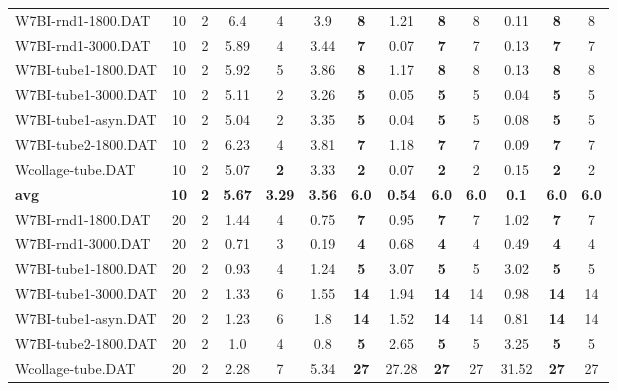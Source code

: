 \begin{table}[h]
{\begin{tabular}{lcccccccccccc}
W7BI-rnd1-1800.DAT & 10 & 2 & 6.4 & 4 & 3.9 &  \textbf{8} & 1.21 &  \textbf{8} & 8 &  \textcolor{blue2}{0.11} &  \textbf{8} & 8 \\
W7BI-rnd1-3000.DAT & 10 & 2 & 5.89 & 4 & 3.44 &  \textbf{7} &  \textcolor{blue2}{0.07} &  \textbf{7} & 7 & 0.13 &  \textbf{7} & 7 \\
W7BI-tube1-1800.DAT & 10 & 2 & 5.92 & 5 & 3.86 &  \textbf{8} & 1.17 &  \textbf{8} & 8 &  \textcolor{blue2}{0.13} &  \textbf{8} & 8 \\
W7BI-tube1-3000.DAT & 10 & 2 & 5.11 & 2 & 3.26 &  \textbf{5} & 0.05 &  \textbf{5} & 5 &  \textcolor{blue2}{0.04} &  \textbf{5} & 5 \\
W7BI-tube1-asyn.DAT & 10 & 2 & 5.04 & 2 & 3.35 &  \textbf{5} &  \textcolor{blue2}{0.04} &  \textbf{5} & 5 & 0.08 &  \textbf{5} & 5 \\
W7BI-tube2-1800.DAT & 10 & 2 & 6.23 & 4 & 3.81 &  \textbf{7} & 1.18 &  \textbf{7} & 7 &  \textcolor{blue2}{0.09} &  \textbf{7} & 7 \\
Wcollage-tube.DAT & 10 & 2 & 5.07 &  \textbf{2} & 3.33 &  \textbf{2} &  \textcolor{blue2}{0.07} &  \textbf{2} & 2 & 0.15 &  \textbf{2} & 2 \\
\cline{1-13} \textbf{avg} & \textbf{10} & \textbf{2} & \textbf{5.67} & \textbf{3.29} & \textbf{3.56} & \textbf{6.0} & \textbf{0.54} & \textbf{6.0} & \textbf{6.0} & \textbf{0.1} & \textbf{6.0} & \textbf{6.0} \\ \cline{1-13}
W7BI-rnd1-1800.DAT & 20 & 2 & 1.44 & 4 &  \textcolor{blue2}{0.75} &  \textbf{7} & 0.95 &  \textbf{7} & 7 & 1.02 &  \textbf{7} & 7 \\
W7BI-rnd1-3000.DAT & 20 & 2 & 0.71 & 3 &  \textcolor{blue2}{0.19} &  \textbf{4} & 0.68 &  \textbf{4} & 4 & 0.49 &  \textbf{4} & 4 \\
W7BI-tube1-1800.DAT & 20 & 2 &  \textcolor{blue2}{0.93} & 4 & 1.24 &  \textbf{5} & 3.07 &  \textbf{5} & 5 & 3.02 &  \textbf{5} & 5 \\
W7BI-tube1-3000.DAT & 20 & 2 & 1.33 & 6 & 1.55 &  \textbf{14} & 1.94 &  \textbf{14} & 14 &  \textcolor{blue2}{0.98} &  \textbf{14} & 14 \\
W7BI-tube1-asyn.DAT & 20 & 2 & 1.23 & 6 & 1.8 &  \textbf{14} & 1.52 &  \textbf{14} & 14 &  \textcolor{blue2}{0.81} &  \textbf{14} & 14 \\
W7BI-tube2-1800.DAT & 20 & 2 & 1.0 & 4 &  \textcolor{blue2}{0.8} &  \textbf{5} & 2.65 &  \textbf{5} & 5 & 3.25 &  \textbf{5} & 5 \\
Wcollage-tube.DAT & 20 & 2 &  \textcolor{blue2}{2.28} & 7 & 5.34 &  \textbf{27} & 27.28 &  \textbf{27} & 27 & 31.52 &  \textbf{27} & 27 \\

\end{tabular}}
\end{table}
